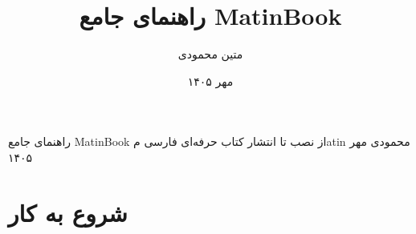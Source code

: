 \documentclass{matinbook}
\title{راهنمای جامع MatinBook}
\author{متین محمودی}
\date{مهر ۱۴۰۵}
\begin{document}
\makecover
    {راهنمای جامع MatinBook}
    {از نصب تا انتشار کتاب حرفه‌ای فارسی}
    {مatin محمودی}
    {مهر ۱۴۰۵}

\frontmatter
\frontmattergeometry

\maketitle


\clearpage


\clearpage


\clearpage


\clearpage

\mainmatter
\mainmattergeometry

\tableofcontents
\clearpage

\listoffigures
\clearpage

\listoftables
\clearpage

\listofalgorithms
\clearpage

\listofalgorithms
\clearpage

\part{شروع به کار}
\label{part:getting-started}






\end{document}
